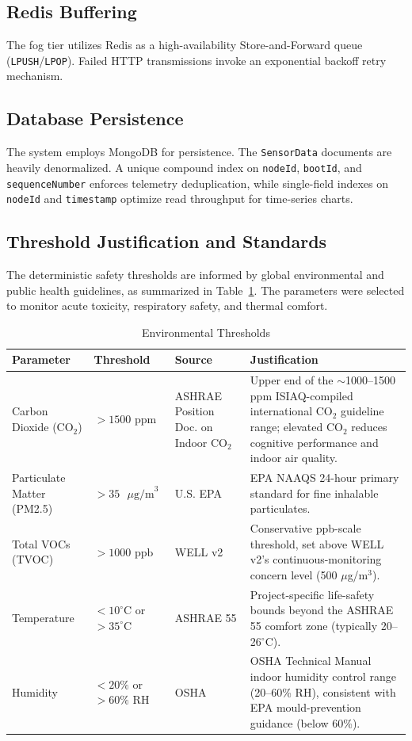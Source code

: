\documentclass[conference]{IEEEtran}
\begin{document}
\subsection{Redis Buffering}
The fog tier utilizes Redis as a high-availability Store-and-Forward queue (\texttt{LPUSH}/\texttt{LPOP}). Failed HTTP transmissions invoke an exponential backoff retry mechanism.

\subsection{Database Persistence}
The system employs MongoDB for persistence. The \texttt{SensorData} documents are heavily denormalized. A unique compound index on \texttt{nodeId}, \texttt{bootId}, and \texttt{sequenceNumber} enforces telemetry deduplication, while single-field indexes on \texttt{nodeId} and \texttt{timestamp} optimize read throughput for time-series charts.

\subsection{Threshold Justification and Standards}
The deterministic safety thresholds are informed by global environmental and public health guidelines, as summarized in Table~\ref{tab:thresholds}. The parameters were selected to monitor acute toxicity, respiratory safety, and thermal comfort.

\begin{table}[h]
\centering
\caption{Environmental Thresholds}
\label{tab:thresholds}
{\footnotesize\setlength{\tabcolsep}{3pt}
\begin{tabular}{|>{\raggedright\arraybackslash}p{2.0cm}|>{\raggedright\arraybackslash}p{1.4cm}|>{\raggedright\arraybackslash}p{1.4cm}|>{\raggedright\arraybackslash}p{2.4cm}|}
\hline
\textbf{Parameter} & \textbf{Threshold} & \textbf{Source} & \textbf{Justification} \\ \hline
Carbon Dioxide (CO$_2$) & $> 1500\text{ ppm}$ & ASHRAE Position Doc. on Indoor CO$_2$ \cite{b15} & Upper end of the $\sim$1000--1500 ppm ISIAQ-compiled international CO$_2$ guideline range; elevated CO$_2$ reduces cognitive performance and indoor air quality. \\ \hline
Particulate Matter (PM2.5) & $> 35\text{ }\mu\text{g/m}^3$ & U.S. EPA \cite{b4} & EPA NAAQS 24-hour primary standard for fine inhalable particulates. \\ \hline
Total VOCs (TVOC) & $> 1000\text{ ppb}$ & WELL v2 \cite{b5} & Conservative ppb-scale threshold, set above WELL v2's continuous-monitoring concern level (500 $\mu$g/m$^3$). \\ \hline
Temperature & $< 10^\circ\text{C}$ or $> 35^\circ\text{C}$ & ASHRAE 55 \cite{b1} & Project-specific life-safety bounds beyond the ASHRAE 55 comfort zone (typically 20--26$^\circ$C). \\ \hline
Humidity & $< 20\%$ or $> 60\%$ RH & OSHA \cite{b14} & OSHA Technical Manual indoor humidity control range (20--60\% RH), consistent with EPA mould-prevention guidance (below 60\%). \\ \hline
\end{tabular}}
\end{table}
\end{document}
